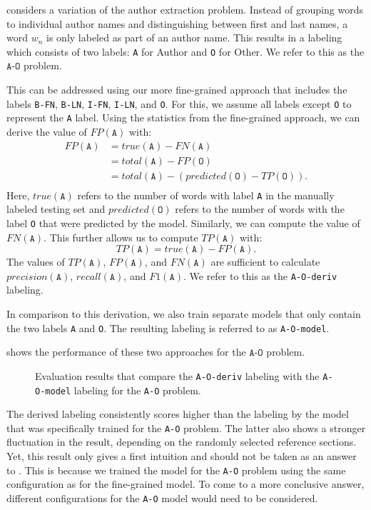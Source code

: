 \bigskip

 considers a variation of the author extraction problem.
Instead of grouping words to individual author names and distinguishing between first and last names, a word $w_n$ is only labeled as part of an author name.
This results in a labeling which consists of two labels:
\texttt{A} for Author and \texttt{O} for Other.
We refer to this as the $\texttt{A-O}$ problem.

This can be addressed using our more fine-grained approach that includes the labels \texttt{B-FN}, \texttt{B-LN}, \texttt{I-FN}, \texttt{I-LN}, and \texttt{O}.
For this, we assume all labels except \texttt{O} to represent the \texttt{A} label.
Using the statistics from the fine-grained approach, we can derive the value of $FP(\texttt{A})$ with:
\begin{equation*}
\begin{split}
  FP(\texttt{A})&=true(\texttt{A})-FN(\texttt{A})\\
  &=total(\texttt{A})-FP(\texttt{O})\\
  &=total(\texttt{A})-(predicted(\texttt{O})-TP(\texttt{O})).\\
\end{split}
\end{equation*}
Here, $true(\texttt{A})$ refers to the number of words with label \texttt{A} in the manually labeled testing set and $predicted(\texttt{O})$ refers to the number of words with the label \texttt{O} that were predicted by the model.
Similarly, we can compute the value of $FN(\texttt{A})$.
This further allows us to compute $TP(\texttt{A})$ with:
\begin{equation*}
  TP(\texttt{A})=true(\texttt{A})-FP(\texttt{A}).
\end{equation*}
The values of $TP(\texttt{A})$, $FP(\texttt{A})$, and $FN(\texttt{A})$ are sufficient to calculate $precision(\texttt{A})$, $recall(\texttt{A})$, and $F1(\texttt{A})$.
We refer to this as the \texttt{A-O-deriv} labeling.

In comparison to this derivation, we also train separate models that only contain the two labels \texttt{A} and \texttt{O}.
The resulting labeling is referred to as \texttt{A-O-model}.

 shows the performance of these two approaches for the $\texttt{A-O}$ problem.
\begin{figure}[t]

\caption{Evaluation results that compare the \texttt{A-O-deriv} labeling with the \texttt{A-O-model} labeling for the \texttt{A-O} problem.}
\label{fig:eval-authors-only}
\end{figure}
The derived labeling consistently scores higher than the labeling by the model that was specifically trained for the \texttt{A-O} problem.
The latter also shows a stronger fluctuation in the result, depending on the randomly selected reference sections.
Yet, this result only gives a first intuition and should not be taken as an answer to .
This is because we trained the model for the \texttt{A-O} problem using the same configuration as for the fine-grained model.
To come to a more conclusive answer, different configurations for the \texttt{A-O} model would need to be considered.

